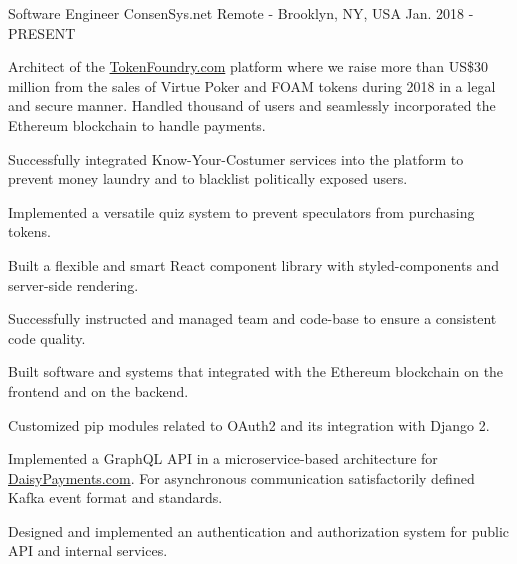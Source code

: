 

\begin{cventries}

  \cventry
    {Software Engineer}
    {ConsenSys.net}
    {Remote - Brooklyn, NY, USA}
    {Jan. 2018 - PRESENT}
    {
      \begin{cvitems}
        \item Architect of the \href{https://old.tokenfoundry.com/}{TokenFoundry.com} platform where we raise more than US\$30 million from the sales of Virtue Poker and FOAM tokens during 2018 in a legal and secure manner. Handled thousand of users and seamlessly incorporated the Ethereum blockchain to handle payments.
        \item Successfully integrated Know-Your-Costumer services into the platform to prevent money laundry and to blacklist politically exposed users.
        \item Implemented a versatile quiz system to prevent speculators from purchasing tokens.
        \item Built a flexible and smart React component library with styled-components and server-side rendering.
        \item {Successfully instructed and managed team and code-base to ensure a consistent code quality.}
        \item {Built software and systems that integrated with the Ethereum blockchain on the frontend and on the backend.}
        \item {Customized pip modules related to OAuth2 and its integration with Django 2.}
        \item Implemented a GraphQL API in a microservice-based architecture for \href{https://www.daisypayments.com}{DaisyPayments.com}. For asynchronous communication satisfactorily defined Kafka event format and standards.
        \item Designed and implemented an authentication and authorization system for public API and internal services.
      \end{cvitems}
    }
  

\end{cventries}
